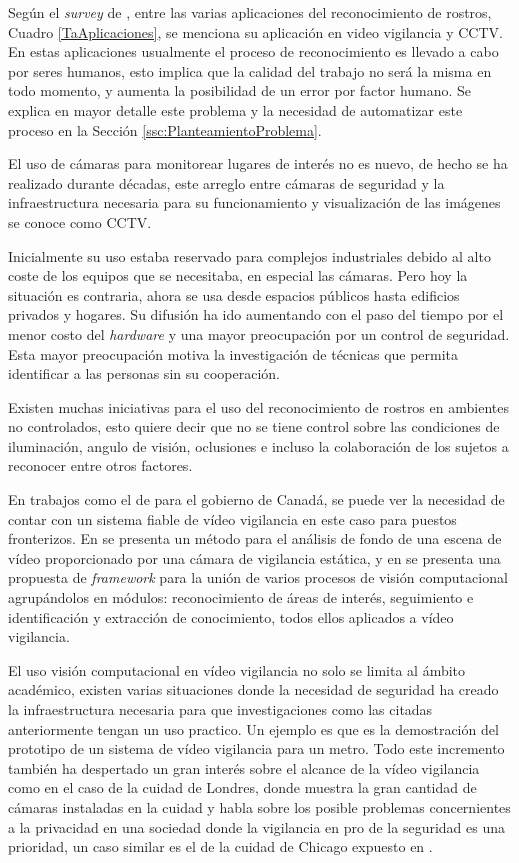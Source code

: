 Según el \textit{survey} de \cite{zhao2003face}, entre las varias aplicaciones del reconocimiento de rostros, Cuadro \ref{TaAplicaciones}, se menciona su aplicación en video vigilancia y \ac{CCTV}. En estas aplicaciones usualmente el proceso de reconocimiento es llevado a cabo por seres humanos, esto implica que la calidad del trabajo no será la misma en todo momento, y aumenta la posibilidad de un error por factor humano. Se explica en mayor detalle este problema y la necesidad de automatizar este proceso en la Sección \ref{ssc:PlanteamientoProblema}.

El uso de cámaras para monitorear lugares de interés no es nuevo, de hecho se ha realizado durante décadas, este arreglo entre cámaras de seguridad y la infraestructura necesaria para su funcionamiento y visualización de las imágenes se conoce como \ac{CCTV}. 

Inicialmente su uso estaba reservado para complejos industriales debido al alto coste de los equipos que se necesitaba, en especial las cámaras. Pero hoy la situación es contraria, ahora se usa desde espacios públicos hasta edificios privados y hogares. Su difusión ha ido aumentando con el paso del tiempo por el menor costo del \textit{hardware} y una mayor preocupación por un control de seguridad. Esta mayor preocupación motiva la investigación de técnicas que permita identificar a las personas sin su cooperación.

Existen muchas iniciativas para el uso del reconocimiento de rostros en ambientes no controlados, esto quiere decir que no se tiene control sobre las condiciones de iluminación, angulo de visión, oclusiones e incluso la colaboración de los sujetos a reconocer entre otros factores.
 
En trabajos como el de \cite{gorodnichy2014survey} para el gobierno de Canadá, se puede ver la necesidad de contar con un sistema fiable de vídeo vigilancia en este caso para puestos fronterizos. En  \cite{tian2005robust} se presenta un método para el análisis de fondo de una escena de vídeo proporcionado por una cámara de vigilancia estática, y en \cite{nazare2014smart} se presenta una propuesta de \textit{framework} para la unión de varios procesos de visión computacional agrupándolos en módulos: reconocimiento de áreas de interés, seguimiento e identificación y extracción de conocimiento, todos ellos aplicados a vídeo vigilancia.

El uso visión computacional en vídeo vigilancia no solo se limita al ámbito académico, existen varias situaciones donde la necesidad de seguridad ha creado la infraestructura necesaria para que investigaciones como las citadas anteriormente tengan un uso practico. Un ejemplo es \cite{odobez2012unsupervised} que es la demostración del prototipo de un sistema de vídeo vigilancia para un metro. Todo este incremento también ha despertado un gran interés sobre el alcance de la vídeo vigilancia como en el caso de la cuidad de Londres, donde \cite{wood2006report} muestra la gran cantidad de cámaras instaladas en la cuidad y habla sobre los posible problemas concernientes a la privacidad en una sociedad donde la vigilancia en pro de la seguridad es una prioridad, un caso similar es el de la cuidad de Chicago expuesto en \cite{schwartz2012chicago}.

